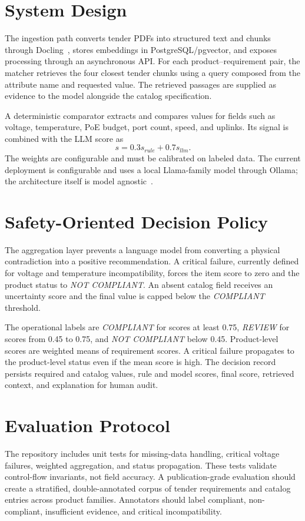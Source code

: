 \documentclass[conference]{IEEEtran}
\begin{document}
\section{System Design}
The ingestion path converts tender PDFs into structured text and chunks through Docling~\cite{deep2025docling}, stores embeddings in PostgreSQL/pgvector, and exposes processing through an asynchronous API. For each product--requirement pair, the matcher retrieves the four closest tender chunks using a query composed from the attribute name and requested value. The retrieved passages are supplied as evidence to the model alongside the catalog specification.

A deterministic comparator extracts and compares values for fields such as voltage, temperature, PoE budget, port count, speed, and uplinks. Its signal is combined with the LLM score as
\begin{equation}
s=0.3s_{rule}+0.7s_{llm}.
\end{equation}
The weights are configurable and must be calibrated on labeled data. The current deployment is configurable and uses a local Llama-family model through Ollama; the architecture itself is model agnostic~\cite{dubey2024llama}.

\section{Safety-Oriented Decision Policy}
The aggregation layer prevents a language model from converting a physical contradiction into a positive recommendation. A critical failure, currently defined for voltage and temperature incompatibility, forces the item score to zero and the product status to \emph{NOT COMPLIANT}. An absent catalog field receives an uncertainty score and the final value is capped below the \emph{COMPLIANT} threshold.

The operational labels are \emph{COMPLIANT} for scores at least 0.75, \emph{REVIEW} for scores from 0.45 to 0.75, and \emph{NOT COMPLIANT} below 0.45. Product-level scores are weighted means of requirement scores. A critical failure propagates to the product-level status even if the mean score is high. The decision record persists required and catalog values, rule and model scores, final score, retrieved context, and explanation for human audit.

\section{Evaluation Protocol}
The repository includes unit tests for missing-data handling, critical voltage failures, weighted aggregation, and status propagation. These tests validate control-flow invariants, not field accuracy. A publication-grade evaluation should create a stratified, double-annotated corpus of tender requirements and catalog entries across product families. Annotators should label compliant, non-compliant, insufficient evidence, and critical incompatibility.
\end{document}
